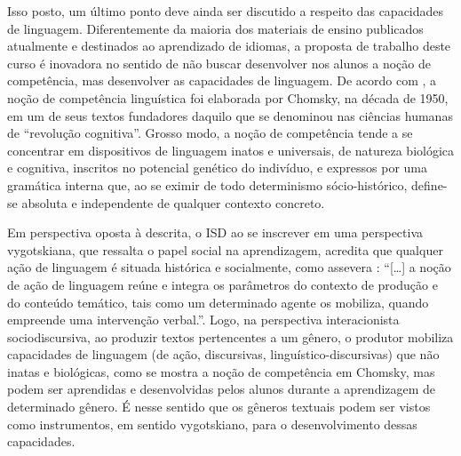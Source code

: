 Isso posto, um último ponto deve ainda ser discutido a respeito das
capacidades de linguagem. Diferentemente da maioria dos materiais de
ensino publicados atualmente e destinados ao aprendizado de idiomas, a
proposta de trabalho deste curso é inovadora no sentido de não buscar
desenvolver nos alunos a noção de competência, mas desenvolver as
capacidades de linguagem. De acordo com \textcite{bronckart_notion_1999}, a noção de competência linguística foi elaborada por Chomsky, na década de 1950,
em um de seus textos fundadores daquilo que se denominou nas ciências
humanas de \enquote{revolução cognitiva}. Grosso modo, a noção de competência
tende a se concentrar em dispositivos de linguagem inatos e universais,
de natureza biológica e cognitiva, inscritos no potencial genético do
indivíduo, e expressos por uma gramática interna que, ao se eximir de
todo determinismo sócio-histórico, define-se absoluta e independente de
qualquer contexto concreto.

Em perspectiva oposta à descrita, o ISD ao se inscrever em uma
perspectiva vygotskiana, que ressalta o papel social na aprendizagem,
acredita que qualquer ação de linguagem é situada histórica e
socialmente, como assevera \textcite[p. 99]{bronckart_atividade_1999}: \enquote{[\ldots] a noção de ação de linguagem reúne e integra os parâmetros do contexto de produção e do conteúdo temático, tais como um determinado agente os mobiliza, quando empreende uma intervenção verbal.}. Logo, na
perspectiva interacionista sociodiscursiva, ao produzir textos
pertencentes a um gênero, o produtor mobiliza capacidades de linguagem
(de ação, discursivas, linguístico-discursivas) que não inatas e
biológicas, como se mostra a noção de competência em Chomsky, mas podem
ser aprendidas e desenvolvidas pelos alunos durante a aprendizagem de
determinado gênero. É nesse sentido que os gêneros textuais podem ser
vistos como instrumentos, em sentido vygotskiano, para o desenvolvimento
dessas capacidades.